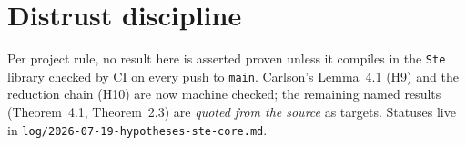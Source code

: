 \documentclass[11pt]{article}
\begin{document}
\section{Distrust discipline}
Per project rule, no result here is asserted proven unless it compiles in
the \texttt{Ste} library checked by CI on every push to \texttt{main}.
Carlson's Lemma~4.1 (H9) and the reduction chain (H10) are now machine
checked; the remaining named results (Theorem~4.1, Theorem~2.3) are
\emph{quoted from the source} as targets. Statuses live in
\texttt{log/2026-07-19-hypotheses-ste-core.md}.



\end{document}
